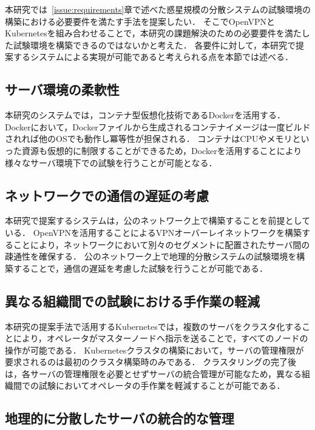 本研究では~\ref{issue:requirements}章で述べた惑星規模の分散システムの試験環境の構築における必要要件を満たす手法を提案したい．
そこでOpenVPNとKubernetesを組み合わせることで，本研究の課題解決のための必要要件を満たした試験環境を構築できるのではないかと考えた．
各要件に対して，本研究で提案するシステムによる実現が可能であると考えられる点を本節では述べる．

\subsection{サーバ環境の柔軟性}
\label{issue:requirements1}

本研究のシステムでは，コンテナ型仮想化技術であるDockerを活用する．
Dockerにおいて，Dockerファイルから生成されるコンテナイメージは一度ビルドされれば他のOSでも動作し冪等性が担保される．
コンテナはCPUやメモリといった資源も仮想的に制限することができるため，Dockerを活用することにより様々なサーバ環境下での試験を行うことが可能となる．

\subsection{ネットワークでの通信の遅延の考慮}
\label{issue:requirements2}

本研究で提案するシステムは，公のネットワーク上で構築することを前提としている．
OpenVPNを活用することによるVPNオーバーレイネットワークを構築することにより，ネットワークにおいて別々のセグメントに配置されたサーバ間の疎通性を確保する．
公のネットワーク上で地理的分散システムの試験環境を構築することで，通信の遅延を考慮した試験を行うことが可能である．

\subsection{異なる組織間での試験における手作業の軽減}
\label{issue:requirements3}

本研究の提案手法で活用するKubernetesでは，複数のサーバをクラスタ化することにより，オペレータがマスターノードへ指示を送ることで，すべてのノードの操作が可能である．
Kubernetesクラスタの構築において，サーバの管理権限が要求されるのは最初のクラスタ構築時のみである．
クラスタリングの完了後は，各サーバの管理権限を必要とせずサーバの統合管理が可能なため，異なる組織間での試験においてオペレータの手作業を軽減することが可能である．

\subsection{地理的に分散したサーバの統合的な管理}
\label{issue:requirements4}

